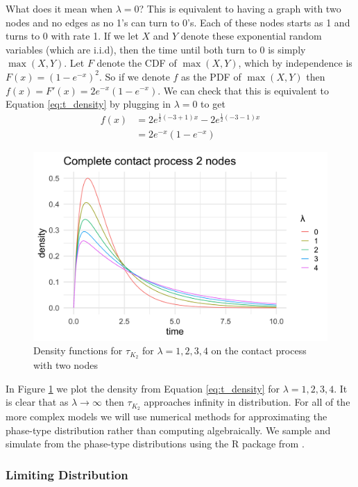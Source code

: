 What does it mean when $\lambda = 0$? This is equivalent to having a graph with two nodes and no edges as no 1's can turn to 0's.
Each of these nodes starts as 1 and turns to 0 with rate 1.
If we let $X$ and $Y$ denote these exponential random variables (which are i.i.d), then  the time until both turn to 0 is simply $\max(X,Y)$.
Let $F$ denote the CDF of $\max(X,Y)$, which by independence is $F(x) = (1 - e^{-x})^2$.
So if we denote $f$ as the PDF of $\max(X,Y)$ then $f(x) = F'(x) = 2e^{-x}(1 - e^{-x})$.
We can check that this is equivalent to Equation \eqref{eq:t_density} by plugging in $\lambda = 0$ to get
\begin{align*}
f(x) &= 2 e^{\frac{1}{2}(-3 + 1)x} - 2e^{\frac{1}{2}(-3 - 1)x}\\
&= 2 e^{-x}(1 - e^{-x})
\end{align*}


\begin{figure}[H]
  \centering
    \includegraphics[width=.80\textwidth]{figures/complete_2_contact_phase_densities.png}
   \caption{Density functions for $\tau_{K_2}$ for $\lambda = 1, 2, 3, 4$ on the contact process with two nodes}
  \label{fig:contact_2_phase_densities}
\end{figure}

In Figure \ref{fig:contact_2_phase_densities} we plot the density from Equation \ref{eq:t_density} for $\lambda = 1, 2, 3, 4$.
It is clear that as $\lambda \to \infty$ then $\tau_{K_2}$ approaches infinity in distribution.
For all of the more complex models we will use numerical methods for approximating the phase-type distribution rather than computing algebraically.
We sample and simulate from the phase-type distributions using the R package from \cite{actuar2008}.

\subsubsection{Limiting Distribution}


